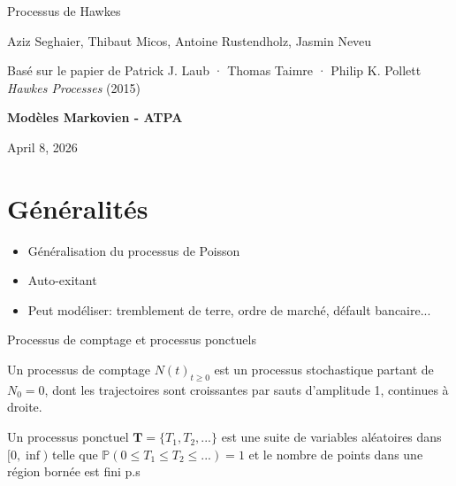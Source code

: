 \documentclass{beamer}
\begin{document}
\begin{frame}[plain]
\centering

{\color{navblue}\LARGE
  Processus de Hawkes
\par}

\vspace{2em}

{\large
Aziz Seghaier, Thibaut Micos, Antoine Rustendholz, Jasmin Neveu
\vspace{0.3em}
\par}

\vspace{1.5em}

{\footnotesize
Basé sur le papier de
Patrick J. Laub · Thomas Taimre · Philip K. Pollett
\textit{Hawkes Processes} (2015)
\par}

\vspace{2em}

{\small \textbf{Modèles Markovien - ATPA} \par}

\vspace{0.5em}

{\scriptsize April 8, 2026 \par}

\end{frame}


\section{Généralités}

\begin{frame}
  \begin{itemize}
    \item Généralisation du processus de Poisson
      \pause
    \item Auto-exitant
      \pause
    \item Peut modéliser: tremblement de terre, ordre de marché, défault bancaire...

\end{itemize}
\end{frame}


\begin{frame}{Processus de comptage et processus ponctuels}
  \begin{definition}
    Un processus de comptage $N(t)_{t \geq 0}$ est un processus stochastique partant de $N_0 = 0$, dont les trajectoires sont croissantes par sauts d'amplitude 1, continues à droite.
  \end{definition}

  \pause
  \begin{definition}
    Un processus ponctuel $\mathbf{T} = \{T_1,T_2,...\}$ est une suite de variables aléatoires dans $[0, \inf)$ telle que $\mathbb{P}(0 \leq T_1 \leq T_2  \leq ...) = 1$ et le nombre de points dans une région bornée est fini p.s
  \end{definition}
\end{frame}
\end{document}
